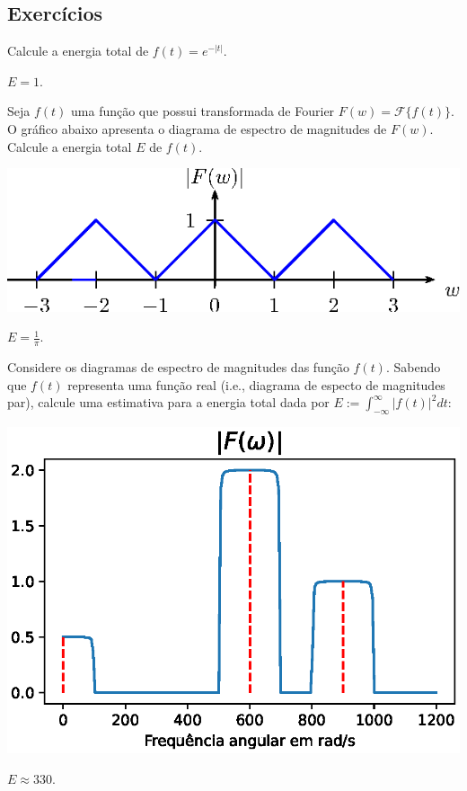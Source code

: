 \subsection*{Exercícios}
\begin{exer} Calcule a energia total de $f(t)=e^{-|t|}$. 
\end{exer}
\begin{resp}$E=1.$
\end{resp}

\begin{exer} Seja $f(t)$ uma função que possui transformada de Fourier $F(w)=\mathcal{F}\{f(t)\}$. O gráfico abaixo apresenta o diagrama de espectro de magnitudes de $F(w)$. Calcule a energia total $E$ de $f(t)$.
\begin{center}
     \includegraphics{cap_propriedades_transformada/pics/diagrama_7A}
\end{center}
\end{exer}
\begin{resp}
    $E=\frac{1}{\pi}.$
\end{resp}

\begin{exer} Considere os diagramas de espectro de magnitudes das função $f(t)$. Sabendo que $f(t)$ representa uma função real (i.e., diagrama de especto de magnitudes par), calcule uma estimativa para a energia total dada por $E:=\int_{-\infty}^\infty |f(t)|^2dt$:

\begin{center}
    \includegraphics{cap_propriedades_transformada/pics/diagrama_FG_2}
\end{center}
\end{exer}
\begin{resp}
    $E\approx 330.$
\end{resp}

